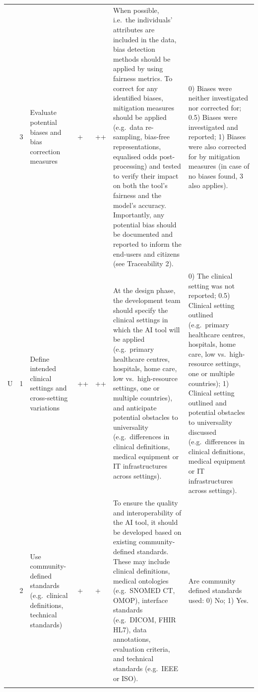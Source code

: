 \begin{landscape}
\begin{longtable}{@{}p{0.9cm}p{0.5cm}p{2.8cm}p{0.6cm}p{0.6cm}p{7.2cm}p{5.5cm}@{}}
	\addlinespace
	& 3 & Evaluate potential biases and bias correction measures & + & ++ & When possible, i.e.\ the individuals' attributes are included in the data, bias detection methods should be applied by using fairness metrics. To correct for any identified biases, mitigation measures should be applied (e.g.\ data re-sampling, bias-free representations, equalised odds post-processing) and tested to verify their impact on both the tool's fairness and the model's accuracy. Importantly, any potential bias should be documented and reported to inform the end-users and citizens (see Traceability 2). & 0) Biases were neither investigated nor corrected for; 0.5) Biases were investigated and reported; 1) Biases were also corrected for by mitigation measures (in case of no biases found, 3 also applies). \\
	\addlinespace
	U & 1 & Define intended clinical settings and cross-setting variations & ++ & ++ & At the design phase, the development team should specify the clinical settings in which the AI tool will be applied (e.g.\ primary healthcare centres, hospitals, home care, low vs.\ high-resource settings, one or multiple countries), and anticipate potential obstacles to universality (e.g.\ differences in clinical definitions, medical equipment or IT infrastructures across settings). & 0) The clinical setting was not reported; 0.5) Clinical setting outlined (e.g.\ primary healthcare centres, hospitals, home care, low vs.\ high-resource settings, one or multiple countries); 1) Clinical setting outlined and potential obstacles to universality discussed (e.g.\ differences in clinical definitions, medical equipment or IT infrastructures across settings). \\
	\addlinespace
	& 2 & Use community-defined standards (e.g.\ clinical definitions, technical standards) & + & + & To ensure the quality and interoperability of the AI tool, it should be developed based on existing community-defined standards. These may include clinical definitions, medical ontologies (e.g.\ SNOMED CT, OMOP), interface standards (e.g.\ DICOM, FHIR HL7), data annotations, evaluation criteria, and technical standards (e.g.\ IEEE or ISO). & Are community defined standards used: 0) No; 1) Yes. \\
	\addlinespace

\end{longtable}
\end{landscape}
